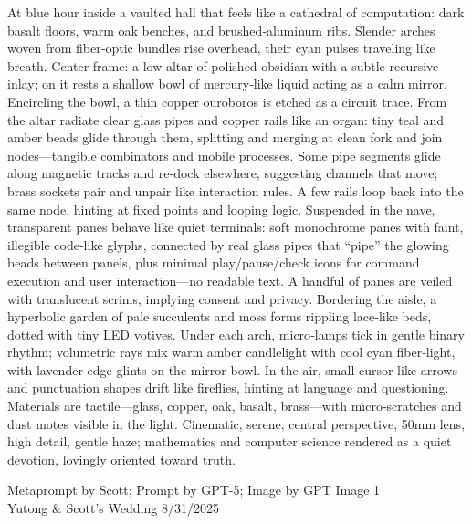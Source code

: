 \documentclass[12pt]{article}
\begin{document}
\noindent
\begin{adjustbox}{max size={\textwidth}{\textheight}}
\begin{varwidth}{\textwidth}
\RaggedRight
\footnotesize
At blue hour inside a vaulted hall that feels like a cathedral of computation: dark basalt floors, warm oak benches, and brushed‑aluminum ribs. Slender arches woven from fiber‑optic bundles rise overhead, their cyan pulses traveling like breath. Center frame: a low altar of polished obsidian with a subtle recursive inlay; on it rests a shallow bowl of mercury‑like liquid acting as a calm mirror. Encircling the bowl, a thin copper ouroboros is etched as a circuit trace. From the altar radiate clear glass pipes and copper rails like an organ: tiny teal and amber beads glide through them, splitting and merging at clean fork and join nodes—tangible combinators and mobile processes. Some pipe segments glide along magnetic tracks and re‑dock elsewhere, suggesting channels that move; brass sockets pair and unpair like interaction rules. A few rails loop back into the same node, hinting at fixed points and looping logic. Suspended in the nave, transparent panes behave like quiet terminals: soft monochrome panes with faint, illegible code‑like glyphs, connected by real glass pipes that “pipe” the glowing beads between panels, plus minimal play/pause/check icons for command execution and user interaction—no readable text. A handful of panes are veiled with translucent scrims, implying consent and privacy. Bordering the aisle, a hyperbolic garden of pale succulents and moss forms rippling lace‑like beds, dotted with tiny LED votives. Under each arch, micro‑lamps tick in gentle binary rhythm; volumetric rays mix warm amber candlelight with cool cyan fiber‑light, with lavender edge glints on the mirror bowl. In the air, small cursor‑like arrows and punctuation shapes drift like fireflies, hinting at language and questioning. Materials are tactile—glass, copper, oak, basalt, brass—with micro‑scratches and dust motes visible in the light. Cinematic, serene, central perspective, 50mm lens, high detail, gentle haze; mathematics and computer science rendered as a quiet devotion, lovingly oriented toward truth.
\end{varwidth}
\end{adjustbox}
\vfill
{\raggedleft\footnotesize
Metaprompt by Scott; Prompt by GPT-5; Image by GPT Image 1 \\
Yutong \& Scott's Wedding 8/31/2025\par}
\end{document}
